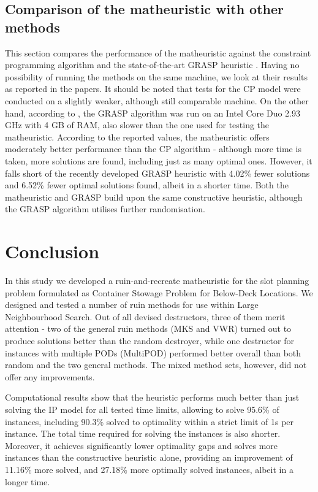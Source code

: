 \documentclass[preprint,12pt,3p]{elsarticle}
\begin{document}
\subsection{Comparison of the matheuristic with other methods}
This section compares the performance of the matheuristic against the constraint programming algorithm \cite{DJJRA12} and the state-of-the-art GRASP heuristic \cite{PPAV16}. Having no possibility of running the methods on the same machine, we look at their results as reported in the papers. It should be noted that tests for the CP model were conducted on a slightly weaker, although still comparable machine. On the other hand, according to \cite{PPAV16}, the GRASP algorithm was run on an Intel Core Duo 2.93 GHz with 4 GB of RAM, also slower than the one used for testing the matheuristic. According to the reported values, the matheuristic offers moderately better performance than the CP algorithm - although more time is taken, more solutions are found, including just as many optimal ones. However, it falls short of the recently developed GRASP heuristic with 4.02\% fewer solutions and 6.52\% fewer optimal solutions found, albeit in a shorter time. Both the matheuristic and GRASP build upon the same constructive heuristic, although the GRASP algorithm utilises further randomisation.

\section{Conclusion}
\label{sec:Conclusion}
In this study we developed a ruin-and-recreate matheuristic for the slot planning problem formulated as Container Stowage Problem for Below-Deck Locations. We designed and tested a number of ruin methods for use within Large Neighbourhood Search. Out of all devised destructors, three of them merit attention - two of the general ruin methods (MKS and VWR) turned out to produce solutions better than the random destroyer, while one destructor for instances with multiple PODs (MultiPOD) performed better overall than both random and the two general methods. The mixed method sets, however, did not offer any improvements.

Computational results show that the heuristic performs much better than just solving the IP model for all tested time limits, allowing to solve 95.6\% of instances, including 90.3\% solved to optimality within a strict limit of 1s per instance. The total time required for solving the instances is also shorter. Moreover, it achieves significantly lower optimality gaps and solves more instances than the constructive heuristic alone, providing an improvement of 11.16\% more solved, and 27.18\% more optimally solved instances, albeit in a longer time.
\end{document}
